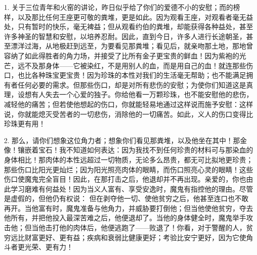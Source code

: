 \par

1. 关于三位青年和火窑的讲论，昨日似乎给了你们的爱德不小的安慰；而的榜样，以及那比任何王座更可敬的粪堆，更是如此。因为观看王座，对观看者毫无益处，只有暂时的快乐，毫无裨益；但从观看约伯的粪堆，却能获得各种益处，甚至许多神圣的智慧和安慰，以培养忍耐。因此，直到今日，许多人进行长途朝圣，甚至漂洋过海，从地极赶到远至，为要看见那粪堆；看见后，就亲吻那土地，那地曾容纳了如此得胜者的角力场，并接受了比所有金子更宝贵的鲜血！因为紫袍的光芒，远不及那身体——它被染红，不是用别人的血，而是用自己的血！就连那些伤口，也比各种珠宝更宝贵！因为珍珠的本性对我们的生活毫无帮助；也不能满足拥有者任何必要的需求。但那些伤口，却是对所有悲伤的安慰；为使你们知道这是真理，设想有人失去一个心爱的独子。你给他看一万颗珍珠，也不能安慰他的悲伤，减轻他的痛苦；但若使他想起的伤口，你就能轻易地通过这样说而施予安慰：这样说，你就能熄灭受苦者的一切悲伤，消除他的一切痛苦。如此，义人的伤口变得比珍珠更有用！\par

2. 那么，请你们想象这位角力者；想象你们看见那粪堆，以及他坐在其中！那金像！镶嵌着宝石！我不知道如何表达：因为我找不到任何珍贵的材料可与那染血的身体相比！那肉体的本性远超过一切物质，无论多么昂贵，都无可比拟地更珍贵；那些伤口比阳光更灿烂；因为阳光照亮肉体的眼睛，而伤口照亮心灵的眼睛！这些伤口使魔鬼完全盲目！因此，在那打击之后，他退却并不再出现。亲爱的，你也由此学习磨难有何益处！因为当义人富有、享受安逸时，魔鬼有指控他的理由。尽管是虚假的，但他仍有权说： 但在剥夺他一切、使他贫穷之后，他甚至连口也不敢再开。当他富有时，魔鬼准备与他角力，并威胁要打倒他；但当他使他贫穷，夺去他所有，并把他投入最深苦难之后，他便退却了。当他的身体健全时，魔鬼举手攻击他；但当他击打他的肉体后，他便逃跑了——败退了！你看，对于警醒的人，贫穷远比财富更好、更有益；疾病和衰弱比健康更好；考验比安宁更好，因为它使角斗者更光荣、更有力！\par

